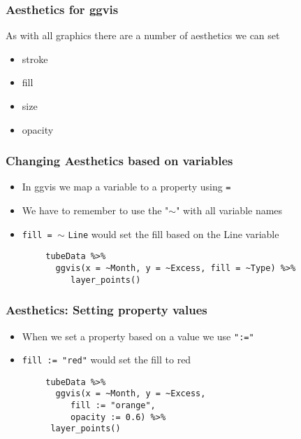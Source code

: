 \documentclass[MASTER.tex]{subfiles}
\begin{document}
 
\begin{frame}
	\frametitle{Aesthetics for ggvis}
	\Large
	As with all graphics there are a number of
	aesthetics we can set
	\begin{itemize}
		\item stroke
		\item fill
		\item size
		\item opacity
	\end{itemize}
\end{frame}

\begin{frame}
	\frametitle{Changing Aesthetics based on variables}
	\Large
	\begin{itemize}
		\item In ggvis we map a variable to a property using \texttt{=}
		\item We have to remember to use the "$\sim$" with all
		variable names
		\item \texttt{fill = }$\sim$ \texttt{Line} would set the fill based on the Line
		variable
	\end{itemize}
\end{frame}
\begin{frame}[fragile]
	\Large
	\begin{framed}
		\begin{verbatim}
		tubeData %>%
		  ggvis(x = ~Month, y = ~Excess, fill = ~Type) %>%
		     layer_points()
		\end{verbatim}
	\end{framed}
	
\end{frame}
\begin{frame}[fragile]
	\frametitle{Aesthetics: Setting property values}
	\Large
	\begin{itemize}
		\item When we set a property based on a value we use
		\texttt{":="}
		\item \texttt{fill := "red"} would set the fill to red
	\end{itemize}
\end{frame}
\begin{frame}[fragile]
	\Large
	\begin{framed}
		\begin{verbatim}
		tubeData %>%
		  ggvis(x = ~Month, y = ~Excess, 
		     fill := "orange",
	         opacity := 0.6) %>%
		 layer_points()
		
		\end{verbatim}
	\end{framed}
	
	
\end{frame}
\end{document}

